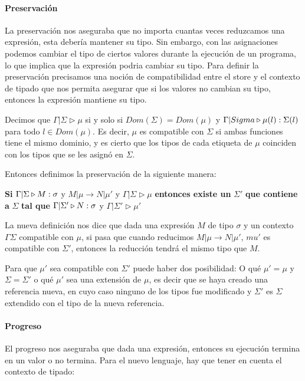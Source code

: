\paragraph{Preservación} La preservación nos aseguraba que no importa cuantas veces reduzcamos una expresión, esta debería mantener su tipo. Sin embargo, con las asignaciones podemos cambiar el tipo de ciertos valores durante la ejecución de un programa, lo que implica que la expresión podria cambiar su tipo. Para definir la preservación precisamos una noción de compatibilidad entre el store y el contexto de tipado que nos permita asegurar que si los valores no cambian su tipo, entonces la expresión mantiene su tipo.

Decimos que $\Gamma|\Sigma\triangleright\mu$ si y solo si $Dom(\Sigma) = Dom(\mu)$ y $\Gamma|Sigma\triangleright \mu(l) : \Sigma(l)$ para todo $l\in Dom(\mu)$. Es decir, $\mu$ es compatible con $\Sigma$ si ambas funciones tiene el mismo dominio, y es cierto que los tipos de cada etiqueta de $\mu$ coinciden con los tipos que se les asignó en $\Sigma$.

Entonces definimos la preservación de la siguiente manera:
\begin{centrado}
    \textbf{Si}  $\Gamma|\Sigma\triangleright M : \sigma$ y $M|\mu\to N|\mu'$ y $\Gamma|\Sigma\triangleright\mu$ \textbf{entonces existe un} $\Sigma'$ \textbf{que contiene a} $\Sigma$\textbf{ tal que} $\Gamma|\Sigma'\triangleright N : \sigma$ y $\Gamma|\Sigma'\triangleright\mu'$
\end{centrado}

La nueva definición nos dice que dada una expresión $M$ de tipo $\sigma$ y un contexto $\Gamma\Sigma$ compatible con $\mu$, si pasa que cuando reducimos $M|\mu\to N|\mu'$, $mu'$ es compatible con $\Sigma'$, entonces la reducción tendrá el mismo tipo que $M$.

Para que $\mu'$ sea compatible con $\Sigma'$ puede haber dos posibilidad: O qué $\mu' = \mu$ y $\Sigma = \Sigma'$ o qué $\mu'$ sea una extensión de $\mu$, es decir que se haya creado una referencia nueva, en cuyo caso ninguno de los tipos fue modificado y $\Sigma'$ es $\Sigma$ extendido con el tipo de la nueva referencia.

\paragraph{Progreso} El progreso nos aseguraba que dada una expresión, entonces su ejecución termina en un valor o no termina. Para el nuevo lenguaje, hay que tener en cuenta el contexto de tipado:

